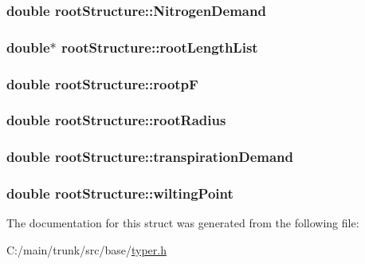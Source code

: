\label{structroot_structure_a6279d30c06e19a3e088f57fd6d793ed9}
\hypertarget{structroot_structure_ac0f131a12d7d312fb63c8f5731d2bedd}{
\subsubsection[{NitrogenDemand}]{\setlength{\rightskip}{0pt plus 5cm}double {\bf rootStructure::NitrogenDemand}}}
\label{structroot_structure_ac0f131a12d7d312fb63c8f5731d2bedd}
\hypertarget{structroot_structure_a20025f911a33441a80de37712a1a659c}{
\subsubsection[{rootLengthList}]{\setlength{\rightskip}{0pt plus 5cm}double$\ast$ {\bf rootStructure::rootLengthList}}}
\label{structroot_structure_a20025f911a33441a80de37712a1a659c}
\hypertarget{structroot_structure_aeb9a13ce72bd039bc6821e4264b2da64}{
\subsubsection[{rootpF}]{\setlength{\rightskip}{0pt plus 5cm}double {\bf rootStructure::rootpF}}}
\label{structroot_structure_aeb9a13ce72bd039bc6821e4264b2da64}
\hypertarget{structroot_structure_ae822dd60a6dd1507a84c10ab228fe97e}{
\subsubsection[{rootRadius}]{\setlength{\rightskip}{0pt plus 5cm}double {\bf rootStructure::rootRadius}}}
\label{structroot_structure_ae822dd60a6dd1507a84c10ab228fe97e}
\hypertarget{structroot_structure_a9a245fabd4034d40698a238e789c3c7d}{
\subsubsection[{transpirationDemand}]{\setlength{\rightskip}{0pt plus 5cm}double {\bf rootStructure::transpirationDemand}}}
\label{structroot_structure_a9a245fabd4034d40698a238e789c3c7d}
\hypertarget{structroot_structure_add1609bfc545cff300e81d8b707a0a4c}{
\subsubsection[{wiltingPoint}]{\setlength{\rightskip}{0pt plus 5cm}double {\bf rootStructure::wiltingPoint}}}
\label{structroot_structure_add1609bfc545cff300e81d8b707a0a4c}


The documentation for this struct was generated from the following file:\begin{DoxyCompactItemize}
\item 
C:/main/trunk/src/base/\hyperlink{typer_8h}{typer.h}\end{DoxyCompactItemize}
